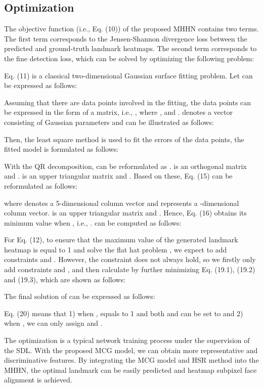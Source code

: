 \documentclass[journal]{IEEEtran}
\begin{document}
\subsection{Optimization}
The objective function (i.e., Eq. (10)) of the proposed MHHN contains two terms. The first term corresponds to the Jensen-Shannon divergence loss between the predicted and ground-truth landmark heatmaps. The second term corresponds to the fine detection loss, which can be solved by optimizing the following problem:

\indent Eq. (11) is a classical two-dimensional Gaussian surface fitting problem. Let
 can be expressed as follows:

\indent Assuming that there are  data points involved in the fitting, the  data points can be expressed in the form of a matrix, i.e., , where ,  and .   denotes a vector consisting of Gaussian parameters and can be illustrated as follows:

\indent Then, the least square method is used to fit the errors of the  data points, the fitted model is formulated as follows:

\indent With the QR decomposition,  can be reformulated as .  is an orthogonal matrix and .  is an upper triangular matrix and . Based on these, Eq. (15) can be reformulated as follows:

where  denotes a 5-dimensional column vector and  represents a  -dimensional column vector.  is an upper triangular matrix and . Hence, Eq. (16) obtains its minimum value when , i.e., .  can be computed as follows:

\indent For Eq. (12), to ensure that the maximum value of the generated landmark heatmap is equal to 1 and solve the flat hat problem \cite{Liu2019SemanticAF}, we expect to add constraints  and . However, the constraint  does not always hold, so we firstly only add constraints  and , and then calculate  by further minimizing Eq. (19.1), (19.2) and (19.3), which are shown as follows:

\indent The final solution of  can be expressed as follows:

\indent Eq. (20) means that 1) when ,  equals to 1 and both  and  can be set to  and 2) when , we can only assign  and . 

\indent The optimization is a typical network training process under the supervision of the SDL. With the proposed MCG model, we can obtain more representative and discriminative features. By integrating the MCG model and HSR method into the MHHN, the optimal landmark can be easily predicted and heatmap subpixel face alignment is achieved.
\end{document}
